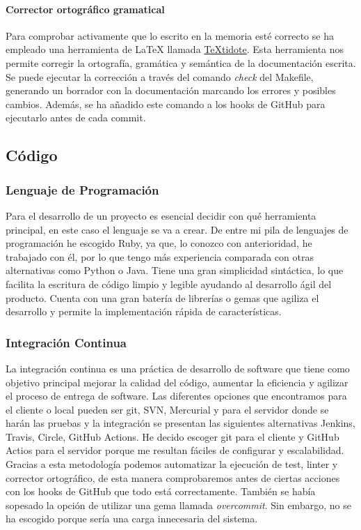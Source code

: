 \paragraph*{Corrector ortográfico gramatical}
Para comprobar activamente que lo escrito en la memoria esté correcto se ha empleado una herramienta de LaTeX llamada \href{https://github.com/sylvainhalle/textidote}{TeXtidote}.
Esta herramienta nos permite corregir la ortografía, gramática y semántica de la documentación escrita. Se puede ejecutar la corrección a través del comando \textit{check} del Makefile,
generando un borrador con la documentación marcando los errores y posibles cambios. Además, se ha añadido este comando a los hooks de GitHub para ejecutarlo antes de cada commit.

\subsection{Código}

\subsubsection*{Lenguaje de Programación}
Para el desarrollo de un proyecto es esencial decidir con qué herramienta principal, en este caso el lenguaje se va a crear. De entre mi pila de lenguajes de programación he
escogido Ruby, ya que, lo conozco con anterioridad, he trabajado con él, por lo que tengo más experiencia comparada con otras alternativas como Python o Java.
Tiene una gran simplicidad sintáctica, lo que facilita la escritura de código limpio y legible ayudando al desarrollo ágil del producto.
Cuenta con una gran batería de librerías o gemas que agiliza el desarrollo y permite la implementación rápida de características.

\subsubsection*{Integración Continua}
La integración continua es una práctica de desarrollo de software que tiene como objetivo principal mejorar la calidad del código, aumentar la eficiencia y agilizar el proceso de entrega de software.
Las diferentes opciones que encontramos para el cliente o local pueden ser git, SVN, Mercurial y para el servidor donde se harán las pruebas y la integración se presentan las siguientes
alternativas Jenkins, Travis, Circle, GitHub Actions. He decido escoger git para el cliente y GitHub Actios para el servidor porque me resultan fáciles de configurar y escalabilidad.
Gracias a esta metodología podemos automatizar la ejecución de test, linter y corrector ortográfico, de esta manera comprobaremos antes de ciertas acciones con los hooks de GitHub que todo está
correctamente. También se había sopesado la opción de utilizar una gema llamada \textit{overcommit}. Sin embargo, no se ha escogido porque sería una carga innecesaria del sistema.

